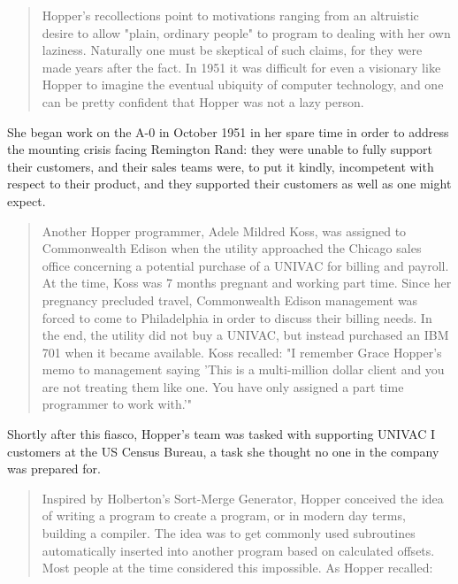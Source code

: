 \begin{quotation}
Hopper's recollections point to motivations
ranging from an altruistic desire to allow "plain, ordinary people"
to program to dealing with her own laziness. Naturally one must
be skeptical of such claims, for they were made years after the
fact. In 1951 it was difficult for even a visionary like Hopper to
imagine the eventual ubiquity of computer technology, and one
can be pretty confident that Hopper was not a lazy person.\cite{grace_hopper_and_the_invention_of_the_information_age_2009}
\end{quotation}

She began work on the A-0 in October 1951 in her spare time in order to address
the mounting crisis facing Remington Rand: they were unable to fully support their
customers, and their sales teams were, to put it kindly, incompetent with respect
to their product, and they supported their customers as well as one might expect.

\begin{quotation}
    Another Hopper programmer, Adele Mildred Koss, was
assigned to Commonwealth Edison when the utility approached
the Chicago sales office concerning a potential purchase of a
UNIVAC for billing and payroll. At the time, Koss was 7 months
pregnant and working part time. Since her pregnancy precluded
travel, Commonwealth Edison management was forced to come
to Philadelphia in order to discuss their billing needs. In the end,
the utility did not buy a UNIVAC, but instead purchased an IBM
701 when it became available. Koss recalled: "I remember Grace
Hopper's memo to management saying 'This is a multi-million
dollar client and you are not treating them like one. You have
only assigned a part time programmer to work with.'"
\cite[Adele Mildred Koss, interviewed by Kathy Kleiman]{grace_hopper_and_the_invention_of_the_information_age_2009}
\end{quotation}

Shortly after this fiasco, Hopper's team was tasked with supporting UNIVAC I customers
at the US Census Bureau, a task she thought no one in the company was prepared for.

\begin{quotation}
Inspired by Holberton's Sort-Merge Generator, Hopper conceived the idea of writing a 
program to create a program, or in modern day terms, building a compiler. 
The idea was to get commonly used subroutines automatically inserted into another program based on calculated offsets. 
Most people at the time considered this impossible. As Hopper recalled:\cite{women_in_computing_history_2002}
\end{quotation}

